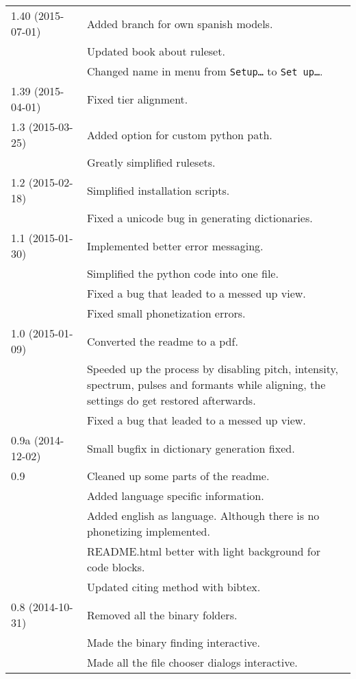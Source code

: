 \begin{longtable}{|p{0.22\linewidth}p{0.8\linewidth}|}
	\hline
	1.40 (2015-07-01) & \tabitem  Added branch for own spanish models.\\
		& \tabitem Updated book about ruleset.\\
		& \tabitem Changed name in menu from \texttt{Setup\ldots} to 
			\texttt{Set up\dots}.\\
	\hline
	1.39 (2015-04-01) & \tabitem Fixed tier alignment.\\
	\hline
	1.3 (2015-03-25) & \tabitem Added option for custom python path.\\
	 & \tabitem Greatly simplified rulesets.\\
	\hline
	1.2 (2015-02-18) & \tabitem Simplified installation scripts.\\
		& \tabitem Fixed a unicode bug in generating dictionaries.\\
	\hline
	1.1 (2015-01-30) & \tabitem Implemented better error messaging.\\
		& \tabitem Simplified the python code into one file.\\
		& \tabitem Fixed a bug that leaded to a messed up view.\\
		& \tabitem Fixed small phonetization errors.\\
	\hline
	1.0 (2015-01-09) & \tabitem Converted the readme to a pdf.\\
		& \tabitem Speeded up the process by disabling pitch, intensity,
spectrum, pulses and formants while aligning, the settings do get restored
afterwards.\\
		& \tabitem Fixed a bug that leaded to a messed up view.\\
	\hline
	0.9a (2014-12-02) & \tabitem Small bugfix in dictionary generation fixed.\\
	\hline
	0.9 & \tabitem Cleaned up some parts of the readme.\\
		& \tabitem Added language specific information.\\
		& \tabitem Added english as language. Although there is no phonetizing
implemented.\\
		& \tabitem README.html better with light background for code blocks.\\
		& \tabitem Updated citing method with bibtex.\\
	\hline
	0.8 (2014-10-31) & \tabitem Removed all the binary folders.\\
		& \tabitem Made the binary finding interactive.\\
		& \tabitem Made all the file chooser dialogs interactive.\\

\end{longtable}
